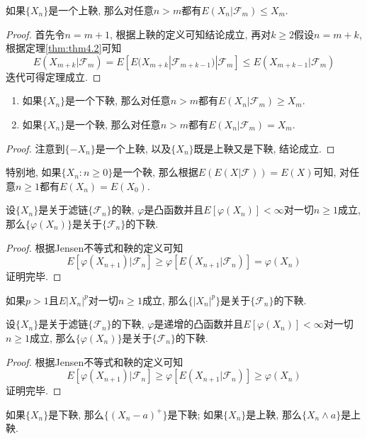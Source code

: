 \documentclass[cn, 12pt, math=mtpro2, bibstyle=apa, blue, twocol]{elegantbook}
\newcommand{\F}{\mathcal{F}}
\begin{document}
\begin{theorem}
  如果$\{X_n\}$是一个上鞅, 那么对任意$n>m$都有$E(X_n|\F_m)\leq X_m$.
\end{theorem}
\begin{proof}
  首先令$n=m+1$, 根据上鞅的定义可知结论成立, 再对$k\ge2$假设$n=m+k$, 根据定理\ref{thm:thm4.2}可知
  $$E(X_{m+k}|\F_m)=E[E(X_{m+k}|\F_{m+k-1})|\F_m]\leq E(X_{m+k-1}|\F_m)$$
  迭代可得定理成立.
\end{proof}
\begin{theorem}
  \begin{enumerate}[label=(\arabic*)]
    \item 如果$\{X_n\}$是一个下鞅, 那么对任意$n>m$都有$E(X_n|\F_m)\geq X_m$.
    \item 如果$\{X_n\}$是一个鞅, 那么对任意$n>m$都有$E(X_n|\F_m)= X_m$.
  \end{enumerate}
\end{theorem}
\begin{proof}
  注意到$\{-X_n\}$是一个上鞅, 以及$\{X_n\}$既是上鞅又是下鞅, 结论成立.
\end{proof}
\begin{remark}
特别地, 如果$\{X_n:n\ge0\}$是一个鞅, 那么根据$E(E(X|\F))=E(X)$可知, 对任意$n\ge1$都有$E(X_n)=E(X_0)$.
\end{remark}
\begin{theorem}
  设$\{X_n\}$是关于滤链$\{\F_n\}$的鞅, $\varphi$是凸函数并且$E[\varphi(X_n)]<\infty$对一切$n\ge1$成立, 那么$\{\varphi(X_n)\}$是关于$\{\F_n\}$的下鞅.
\end{theorem}
\begin{proof}
  根据Jensen不等式和鞅的定义可知
  $$E[\varphi(X_{n+1})|\F_n]\geq\varphi[E(X_{n+1}|\F_n)]=\varphi(X_n)$$
  证明完毕.
\end{proof}
\begin{corollary}
如果$p>1$且$E|X_n|^p$对一切$n\ge1$成立, 那么$\{|X_n|^p\}$是关于$\{\F_n\}$的下鞅.
\end{corollary}
\begin{theorem}\label{thm:thm4.8}
  设$\{X_n\}$是关于滤链$\{\F_n\}$的下鞅, $\varphi$是递增的凸函数并且$E[\varphi(X_n)]<\infty$对一切$n\ge1$成立, 那么$\{\varphi(X_n)\}$是关于$\{\F_n\}$的下鞅.
\end{theorem}
\begin{proof}
  根据Jensen不等式和鞅的定义可知
  $$E[\varphi(X_{n+1})|\F_n]\geq\varphi[E(X_{n+1}|\F_n)]\ge\varphi(X_n)$$
  证明完毕.
\end{proof}
\begin{corollary}\label{cor:cor4.1}
如果$\{X_n\}$是下鞅, 那么$\{(X_n-a)^+\}$是下鞅; 如果$\{X_n\}$是上鞅, 那么$\{X_n\wedge a\}$是上鞅.
\end{corollary}
\end{document}
